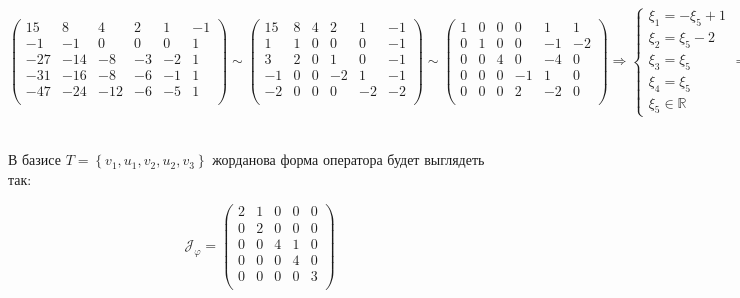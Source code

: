 \documentclass{article}
\begin{document}
$$\left(\begin{array}{ccccc|c}
15 & 8 & 4 & 2 & 1 & -1\\
-1 & -1 & 0 & 0 & 0 & 1\\
-27 & -14 & -8 & -3 & -2 & 1 \\
-31 & -16 & -8 & -6 & -1 & 1\\
-47 & -24 & -12 & -6 & -5 & 1\\
\end{array}\right) \sim \left(\begin{array}{ccccc|c}
15 & 8 & 4 & 2 & 1 & -1\\
1 & 1 & 0 & 0 & 0 & -1\\
3 & 2 & 0 & 1 & 0 & -1 \\
-1 & 0 & 0 & -2 & 1 & -1\\
-2 & 0 & 0 & 0 & -2 & -2\\
\end{array}\right) \sim \left(\begin{array}{ccccc|c}
1 & 0 & 0 & 0 & 1 & 1 \\
0 & 1 & 0 & 0 & -1 & -2\\
0 & 0 & 4 & 0 & -4 & 0\\
0 & 0 & 0 & -1 & 1 & 0\\
0 & 0 & 0 & 2 & -2 & 0\\
\end{array}\right) \Rightarrow \begin{cases}
\xi_1 = -\xi_5 + 1 \\
\xi_2 = \xi_5 - 2 \\
\xi_3 = \xi_5 \\
\xi_4 = \xi_5 \\
\xi_5 \in \mathbb{R}
\end{cases} \Rightarrow u_2 = \begin{pmatrix}
0 \\ -1 \\ 1 \\ 1 \\ 1
\end{pmatrix}$$ \\
\begin{center}
В базисе $T=\left\{v_1, u_1, v_2, u_2, v_3\right\}$ жорданова форма оператора будет выглядеть так:
\end{center}
$$\mathcal{J}_\varphi = \begin{pmatrix}
2 & 1 & 0 & 0 & 0 \\
0 & 2 & 0 & 0 & 0 \\
0 & 0 & 4 & 1 & 0 \\
0 & 0 & 0 & 4 & 0 \\
0 & 0 & 0 & 0 & 3 \\
\end{pmatrix}$$
\end{document}
